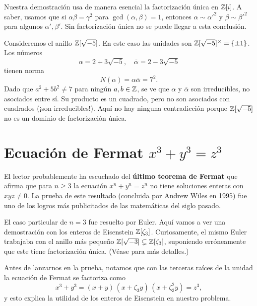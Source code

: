 Nuestra demostración usa de manera esencial la factorización única en
$\mathbb{Z} [i]$. A saber, usamos que si $\alpha\beta = \gamma^2$ para
$\gcd (\alpha,\beta) = 1$, entonces $\alpha \sim \alpha'^2$ y
$\beta \sim \beta'^2$ para algunos $\alpha', \beta'$. Sin factorización
única no se puede llegar a esta conclusión.

\begin{ejemplo}
  Consideremos el anillo $\mathbb{Z} [\sqrt{-5}]$. En este caso las unidades son
  $\mathbb{Z} [\sqrt{-5}]^\times = \{ \pm 1 \}$. Los números
  $$\alpha = 2 + 3\sqrt{-5}, \quad \overline{\alpha} = 2 - 3\sqrt{-5}$$
  tienen norma
  $$N (\alpha) = \alpha\overline{\alpha} = 7^2.$$
  Dado que $a^2 + 5b^2 \ne 7$ para ningún $a,b \in \mathbb{Z}$,
  se ve que $\alpha$ y $\overline{\alpha}$ son irreducibles, no asociados entre
  sí. Su producto es un cuadrado, pero no son asociados con cuadrados
  (¡son irreducibles!). Aquí no hay ninguna contradicción porque
  $\mathbb{Z} [\sqrt{-5}]$ no es un dominio de factorización única.
\end{ejemplo}


\section{Ecuación de Fermat \texorpdfstring{$x^3 + y^3 = z^3$}{$x³ + y³ = z³$}}

El lector probablemente ha escuchado del \textbf{último teorema de Fermat} que
afirma que para $n \ge 3$ la ecuación $x^n + y^n = z^n$ no tiene soluciones
enteras con $xyz \ne 0$. La prueba de este resultado (concluida por Andrew Wiles
en 1995) fue uno de los logros más publicitados de las matemáticas del siglo
pasado.

El caso particular de $n = 3$ fue resuelto por Euler. Aquí vamos a ver una
demostración con los enteros de Eisenstein $\mathbb{Z} [\zeta_3]$. Curiosamente,
el mismo Euler trabajaba con el anillo más pequeño
$\mathbb{Z} [\sqrt{-3}] \subsetneq \mathbb{Z} [\zeta_3]$, suponiendo erróneamente que este
tiene factorización única. (Véase \cite[Chapter 2]{Edwards-1996} para más
detalles.)

Antes de lanzarnos en la prueba, notamos que con las terceras raíces de la
unidad la ecuación de Fermat se factoriza como
$$x^3 + y^3 = (x + y)\,(x + \zeta_3 y)\,(x + \zeta_3^2 y) = z^3,$$
y esto explica la utilidad de los enteros de Eisenstein en nuestro problema.

\vspace{1em}

